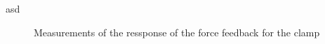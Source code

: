 \begin{minipage}{0.5\linewidth}
	asd
\end{minipage}
\begin{minipage}{0.5\linewidth}
\begin{figure}[H]
		\resizebox{\textwidth}{!}{
 

}
 \caption{Measurements of the ressponse of the force feedback for the clamp}

\end{figure}
\end{minipage}
